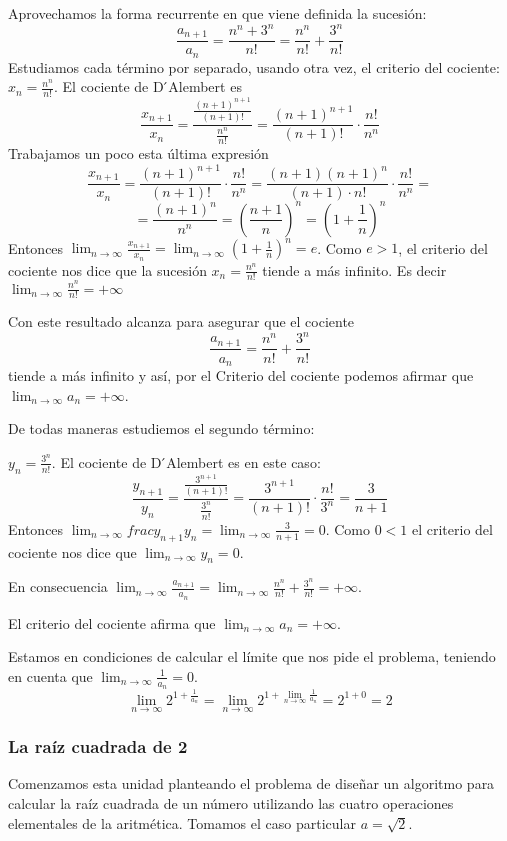 \documentclass[../Teoría.root.tex]{subfiles}
\begin{document}
Aprovechamos la forma recurrente en que viene definida la sucesión:
\[\frac{a_{n+1}}{a_n}=\frac{n^n+3^n}{n!}=\frac{n^n}{n!}+\frac{3^n}{n!}\]
Estudiamos cada término por separado, usando otra vez, el criterio del cociente:
\(x_n=\frac{n^n}{n!}\).
El cociente de D ́Alembert es
\[\frac{x_{n+1}}{x_n}=\frac{\frac{(n+1)^{n+1}}{(n+1)!}}{\frac{n^n}{n!}}=\frac{(n+1)^{n+1}}{(n+1)!}\cdot\frac{n!}{n^n}\]
Trabajamos un poco esta última expresión
\[\frac{x_{n+1}}{x_n}=\frac{(n+1)^{n+1}}{(n+1)!}\cdot\frac{n!}{n^n}=\frac{(n+1)(n+1)^n}{(n+1)\cdot n!}\cdot\frac{n!}{n^n}=\]
\[=\frac{(n+1)^n}{n^n}=\left(\frac{n+1}{n}\right)^n=\left(1+\frac{1}{n}\right)^n\]
Entonces \(\lim_{n\to\infty}\frac{x_{n+1}}{x_n}=\lim_{n\to\infty}\left(1+\frac{1}{n}\right)^n=e\).
Como \(e>1\), el criterio del cociente nos dice que la sucesión \(x_n=\frac{n^n}{n!}\) tiende a más infinito.
Es decir \(\lim_{n\to\infty}\frac{n^n}{n!}=+\infty\)

Con este resultado alcanza para asegurar que el cociente
\[\frac{a_{n+1}}{a_n}=\frac{n^n}{n!}+\frac{3^n}{n!}\]
tiende a más infinito y así, por el Criterio del cociente podemos afirmar que \(\lim_{n\to\infty}a_n=+\infty\).

De todas maneras estudiemos el segundo término:

\(y_n=\frac{3^n}{n!}\).
El cociente de D ́Alembert es en este caso:
\[\frac{y_{n+1}}{y_n}=\frac{\frac{3^{n+1}}{(n+1)!}}{\frac{3^n}{n!}}=\frac{3^{n+1}}{(n+1)!}\cdot\frac{n!}{3^n}=\frac{3}{n+1}\]
Entonces \(\lim_{n\to\infty}frac{y_{n+1}}{y_n}=\lim_{n\to\infty}\frac{3}{n+1}=0\).
Como \(0<1\) el criterio del cociente nos dice que \(\lim_{n\to\infty}y_n=0\).

En consecuencia \(\lim_{n\to\infty}\frac{a_{n+1}}{a_n}=\lim_{n\to\infty}\frac{n^n}{n!}+\frac{3^n}{n!}=+\infty\).

El criterio del cociente afirma que \(\lim_{n\to\infty}a_n=+\infty\).

Estamos en condiciones de calcular el límite que nos pide el problema, teniendo en cuenta que \(\lim_{n\to\infty}\frac{1}{a_n}=0\).
\[\lim_{n\to\infty}2^{1+\frac{1}{a_n}}=\lim_{n\to\infty}2^{1+\lim_{n\to\infty}\frac{1}{a_n}}=2^{1+0}=2\]
\subsubsection{La raíz cuadrada de 2}
Comenzamos esta unidad planteando el problema de diseñar un algoritmo para calcular la raíz cuadrada de un número utilizando las cuatro operaciones elementales de la aritmética.
Tomamos el caso particular \(a=\sqrt{2}\).
\end{document}
